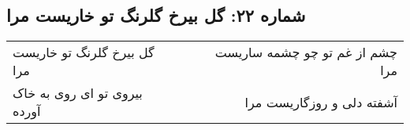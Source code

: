 \begin{center}
\section*{شماره ۲۲: گل بیرخ گلرنگ تو خاریست مرا}
\label{sec:022}
\begin{longtable}{l p{0.5cm} r}
گل بیرخ گلرنگ تو خاریست مرا
&&
چشم از غم تو چو چشمه ساریست مرا
\\
بیروی تو ای روی به خاک آورده
&&
آشفته دلی و روزگاریست مرا
\\
\end{longtable}
\end{center}
